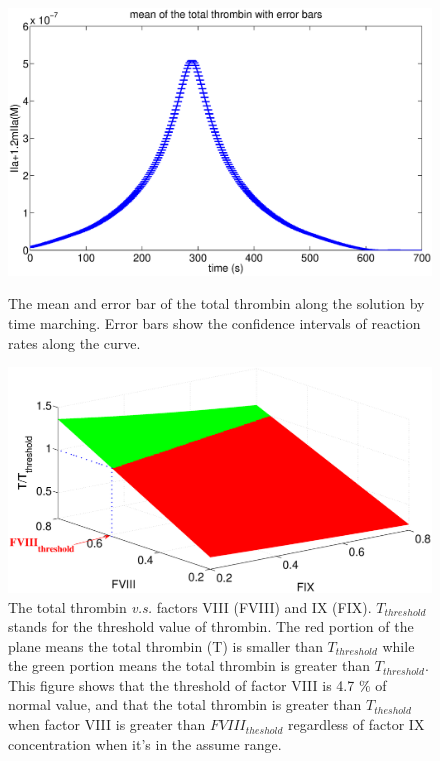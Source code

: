 \begin{figure}
  \begin{center}
  \includegraphics[width=5in]{figures/mean.eps}
\caption{The mean and error bar of the total thrombin along the
solution by time marching. Error bars show the confidence intervals
of reaction rates along the curve. }\label{Fig:mean}


  \includegraphics[width=5in]{figures/F89.eps}
\caption{The total thrombin \textit{v.s.} factors VIII (FVIII) and
IX (FIX). $T_{threshold}$ stands for the threshold  value of
thrombin. The red portion of the plane means the total thrombin (T)
is smaller than $T_{threshold}$ while the green portion means the
total thrombin is greater than $T_{threshold}$. This figure shows
that the threshold of factor VIII is 4.7 \% of normal value, and
that the total thrombin is greater than $T_{theshold}$ when factor
VIII is greater than $FVIII_{theshold}$ regardless of factor IX
concentration when it's in the assume range.}\label{Fig:F89}


  \end{center}
\end{figure}

